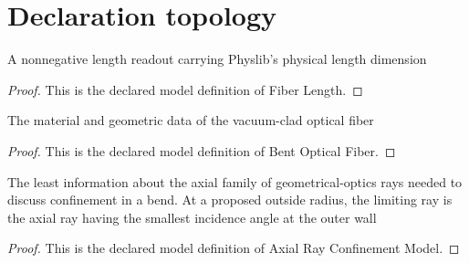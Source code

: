\section{Declaration topology}
\begin{definition}
  \label{def:physics:phyx-mini-0012:phyxmini0012-fiberlength}
  A nonnegative length readout carrying Physlib's physical length dimension
\end{definition}
\begin{proof}
  This is the declared model definition of Fiber Length.
\end{proof}
\begin{definition}
  \label{def:physics:phyx-mini-0012:phyxmini0012-bentopticalfiber}
  The material and geometric data of the vacuum-clad optical fiber
\end{definition}
\begin{proof}
  This is the declared model definition of Bent Optical Fiber.
\end{proof}
\begin{definition}
  \label{def:physics:phyx-mini-0012:phyxmini0012-axialrayconfinementmodel}
  The least information about the axial family of geometrical-optics rays needed to discuss confinement in a bend. At a proposed outside radius, the limiting ray is the axial ray having the smallest incidence angle at the outer wall
\end{definition}
\begin{proof}
  This is the declared model definition of Axial Ray Confinement Model.
\end{proof}
